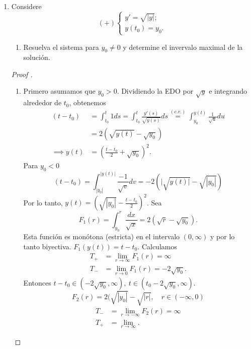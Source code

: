 \documentclass[a4paper]{report}
\begin{document}
\begin{enumerate}
		\item Considere
		\[
		(+) \begin{cases}
			y' = \sqrt{|y|}; \\
			y(t_0) = y_0.
		\end{cases}
		\]
		\begin{enumerate}
			\item Resuelva el sistema para $y_0 \neq 0$ y determine el invervalo maximal de la solución.
		\end{enumerate}
		\begin{proof}[Proof ]~
			\begin{enumerate}
				\item Primero asumamos que $y_0 > 0$. Dividiendo la EDO por $\sqrt{y}$ e integrando alrededor de $t_0$, obtenemos
				\begin{align*}
					(t-t_0) & = \int_{t_0}^{t} 1 ds = \int_{t_0}^{t} \frac{y'(s)}{\sqrt{y(s)}} ds \stackrel{(c.v.)}{=} \int_{y_0}^{y(t)} \frac{1}{\sqrt{u}} du \\
					& = 2 (\sqrt{y(t)} - \sqrt{y_0}) \\
					\implies y(t) & = \left( \frac{t-t_0}{2} + \sqrt{y_0} \right)^2
				.\end{align*}
				\noindent Para $y_0 < 0$
				\[
				(t-t_0) = \int_{|y_0|}^{|y(t)|} \frac{-1}{\sqrt{v}} dv = -2 (|\sqrt{y(t)|} - \sqrt{|y_0|})
				\]
				\noindent Por lo tanto, $y(t) = \left( \sqrt{|y_0|} - \frac{t-t_0}{2} \right)^2$. Sea 
				\[
				F_1(r) = \int_{y_0}^{r} \frac{dx}{\sqrt{x}} = 2 (\sqrt{r} - \sqrt{y_0}).
				\]
				\noindent Esta función es monótona (estricta) en el intervalo $(0,\infty)$ y por lo tanto biyectiva. $F_1(y(t)) = t-t_0$. Calculamos
				\begin{align*}
					T_{+} & = \lim_{r \to \infty} F_1(r) = \infty \\
					T_{-} & = \lim_{r \to 0} F_1(r) = -2 \sqrt{y_0}
				.\end{align*}
				\noindent Entonces $t-t_0 \in (-2 \sqrt{y_0},\infty),\ t \in (t_0-2 \sqrt{y_0}, \infty)$.
				\[
				F_2(r) = 2 ( \sqrt{|y_0|} - \sqrt{|r|}, \quad r \in (-\infty, 0)
				\]
				\begin{align*}
					T_{-} & = \lim_{r \to -\infty} F_2(r) = \infty \\
					T_{+} & = \lim_{r \to \infty} 
				.\end{align*}
			\end{enumerate}
		\end{proof}







	\end{enumerate}






\end{document}
